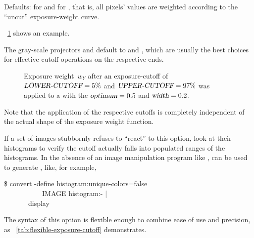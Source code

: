 \begin{codelist}
  Defaults:  for  and
   for , that is, all pixels'
  values are weighted according to the ``uncut'' exposure-weight curve.

  \figureName~\ref{fig:exposure-cutoff} shows an example.

  The gray-scale projectors  and  default
  to  and
  , which are usually the best choices
  for effective cutoff operations on the respective ends.

  \begin{figure}
    \begin{maxipage}
      \centering
    \end{maxipage}

    \caption[Exposure cutoff function]{\label{fig:exposure-cutoff}%
      Exposure weight~$w_Y$ after an exposure-cutoff of $\textsl{LOWER-CUTOFF} = 5\%$ and
      $\textsl{UPPER-CUTOFF} = 97\%$ was applied to a  with the
      $\textsl{optimum} = 0.5$ and $\textsl{width} = 0.2$.}
  \end{figure}

  Note that the application of the respective cutoffs is completely independent of the actual
  shape of the exposure weight function.

  If a set of images stubbornly refuses to ``react'' to this option, look at their histograms to
  verify the cutoff actually falls into populated ranges of the histograms.  In the absence of
  an image manipulation program like ,
   can be used to generate
  , like, for example,

  \begin{terminal}
    \$ convert -define histogram:unique-colors=false \bslash \\
    ~~~~~~~~~~~IMAGE histogram:- | \bslash \\
    ~~~~~~~display
  \end{terminal}

  The syntax of this option is flexible enough to combine ease of use and precision, as
  \tableName~\ref{tab:flexible-exposure-cutoff} demonstrates.


\end{codelist}
